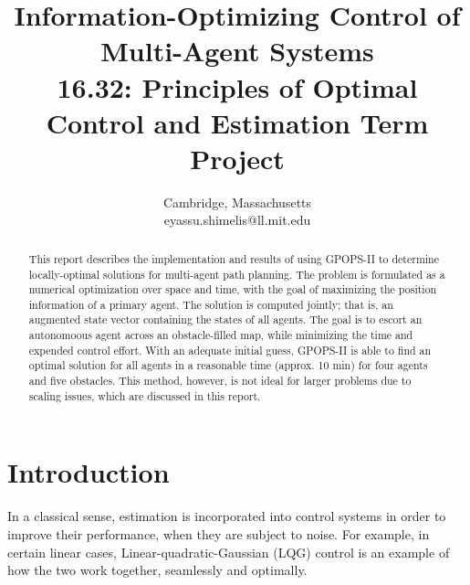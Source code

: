 \documentclass[conference]{IEEEtran}
\begin{document}
\title{Information-Optimizing Control of Multi-Agent Systems\\
{\footnotesize 16.32: Principles of Optimal Control and Estimation Term Project}}

\author{
Cambridge, Massachusetts \\
eyassu.shimelis@ll.mit.edu \\
}

\newcommand{\suma}{\Large$+$}
\newcommand{\inte}{$\displaystyle \int$}
\newcommand{\derv}{\huge$\frac{d}{dt}$}


\maketitle
\thispagestyle{plain}
\pagestyle{plain}

\begin{abstract}
This report describes the implementation and results of using GPOPS-II to determine locally-optimal solutions for multi-agent path planning. The problem is formulated as a numerical optimization over space and time, with the goal of maximizing the position information of a primary agent. The solution is computed jointly; that is, an augmented state vector containing the states of all agents. The goal is to escort an autonomoous agent across an obstacle-filled map, while minimizing the time and expended control effort. With an adequate initial guess, GPOPS-II is able to find an optimal solution for all agents in a reasonable time (approx. 10 min) for four agents and five obstacles. This method, however, is not ideal for larger problems due to scaling issues, which are discussed in this report.
\end{abstract}

\section{Introduction}
In a classical sense, estimation is incorporated into control systems in order to improve their performance, when they are subject to noise. For example, in certain linear cases, Linear-quadratic-Gaussian (LQG) control is an example of how the two work together, seamlessly and optimally.
\end{document}
